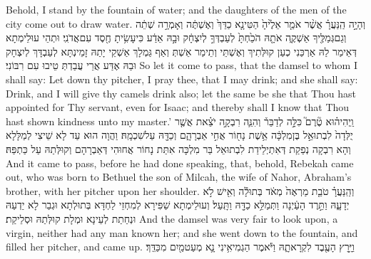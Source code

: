 {Behold, I stand by the fountain of water; and the daughters of the men of the city come out to draw water.}{}
{וְהָיָ֣ה הַֽנַּעֲרָ֗ אֲשֶׁ֨ר אֹמַ֤ר אֵלֶ֙יהָ֙ הַטִּי\maqqaf נָ֤א כַדֵּךְ֙ וְאֶשְׁתֶּ֔ה וְאָמְרָ֣ה שְׁתֵ֔ה וְגַם\maqqaf גְּמַלֶּ֖יךָ אַשְׁקֶ֑ה אֹתָ֤הּ הֹכַ֙חְתָּ֙ לְעַבְדְּךָ֣ לְיִצְחָ֔ק וּבָ֣הּ אֵדַ֔ע כִּי\maqqaf עָשִׂ֥יתָ חֶ֖סֶד עִם\maqqaf אֲדֹנִֽי׃}
{וּתְהֵי עוּלֵימְתָא דְּאֵימַר לַהּ אַרְכַּנִי כְעַן קוּלְּתִיךְ וְאֶשְׁתֵּי וְתֵימַר אֵשְׁתְּ וְאַף גַּמְלָךְ אַשְׁקֵי יָתַהּ זָמֵינְתָּא לְעַבְדָּךְ לְיִצְחָק וּבַהּ אֶדַּע אֲרֵי עֲבַדְתְּ טֵיבוּ עִם רִבּוֹנִי׃}
{So let it come to pass, that the damsel to whom I shall say: Let down thy pitcher, I pray thee, that I may drink; and she shall say: Drink, and I will give thy camels drink also; let the same be she that Thou hast appointed for Thy servant, even for Isaac; and thereby shall I know that Thou hast shown kindness unto my master.’}{}
{וַֽיְהִי\maqqaf ה֗וּא טֶ֘רֶם֮ כִּלָּ֣ה לְדַבֵּר֒ וְהִנֵּ֧ה רִבְקָ֣ה יֹצֵ֗את אֲשֶׁ֤ר יֻלְּדָה֙ לִבְתוּאֵ֣ל בֶּן\maqqaf מִלְכָּ֔ה אֵ֥שֶׁת נָח֖וֹר אֲחִ֣י אַבְרָהָ֑ם וְכַדָּ֖הּ עַל\maqqaf שִׁכְמָֽהּ׃}
{וַהֲוָה הוּא עַד לָא שֵׁיצִי לְמַלָּלָא וְהָא רִבְקָה נְפַקַת דְּאִתְיְלֵידַת לִבְתוּאֵל בַּר מִלְכָּה אִתַּת נָחוֹר אֲחוּהִי דְּאַבְרָהָם וְקוּלְּתַהּ עַל כַּתְפַּהּ׃}
{And it came to pass, before he had done speaking, that, behold, Rebekah came out, who was born to Bethuel the son of Milcah, the wife of Nahor, Abraham’s brother, with her pitcher upon her shoulder.}{}
{וְהַֽנַּעֲרָ֗ טֹבַ֤ת מַרְאֶה֙ מְאֹ֔ד בְּתוּלָ֕ה וְאִ֖ישׁ לֹ֣א יְדָעָ֑הּ וַתֵּ֣רֶד הָעַ֔יְנָה וַתְּמַלֵּ֥א כַדָּ֖הּ וַתָּֽעַל׃}
{וְעוּלֵימְתָא שַׁפִּירָא לְמִחְזֵי לַחְדָּא בְּתוּלְתָא וּגְבַר לָא יַדְעַהּ וּנְחַתַת לְעֵינָא וּמְלָת קוּלְּתַהּ וּסְלֵיקַת׃}
{And the damsel was very fair to look upon, a virgin, neither had any man known her; and she went down to the fountain, and filled her pitcher, and came up.}{}
{וַיָּ֥רׇץ הָעֶ֖בֶד לִקְרָאתָ֑הּ וַיֹּ֕אמֶר הַגְמִיאִ֥ינִי נָ֛א מְעַט\maqqaf מַ֖יִם מִכַּדֵּֽךְ׃}
